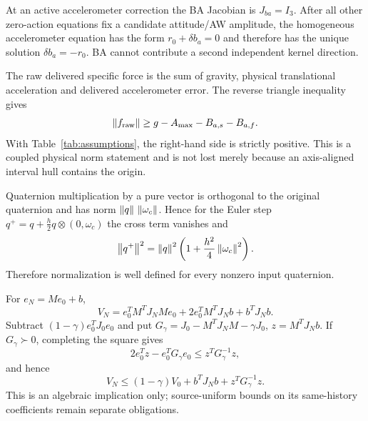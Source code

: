 \documentclass[journal]{IEEEtran}
\begin{document}
\begin{proposition}
At an active accelerometer correction the BA Jacobian is $J_{ba}=I_3$.
After all other zero-action equations fix a candidate attitude/AW amplitude,
the homogeneous accelerometer equation has the form $r_0+\delta b_a=0$ and
therefore has the unique solution $\delta b_a=-r_0$.  BA cannot contribute a
second independent kernel direction.
\end{proposition}

\begin{proposition}
The raw delivered specific force is the sum of gravity, physical translational
acceleration and delivered accelerometer error.  The reverse triangle
inequality gives
\[
 \left\lVert f_{\rm raw}\right\rVert
 \ge g-A_{\max}-B_{a,s}-B_{a,f}.
\]
With Table~\ref{tab:assumptions}, the right-hand side is strictly positive.
This is a coupled physical norm statement and is not lost merely because an
axis-aligned interval hull contains the origin.
\end{proposition}

\begin{proposition}
Quaternion multiplication by a pure vector is orthogonal to the original
quaternion and has norm $\left\lVert q\right\rVert\,\left\lVert\omega_c\right\rVert$.  Hence for the Euler step
$q^+=q+\frac h2q\otimes(0,\omega_c)$ the cross term vanishes and
\[
 \left\lVert q^+\right\rVert^2=\left\lVert q\right\rVert^2\left(1+\frac{h^2}{4}\left\lVert\omega_c\right\rVert^2\right).
\]
Therefore normalization is well defined for every nonzero input quaternion.
\end{proposition}

\begin{proposition}
For $e_N=Me_0+b$,
\[
V_N=e_0^TM^TJ_NMe_0+2e_0^TM^TJ_Nb+b^TJ_Nb .
\]
Subtract $(1-\gamma)e_0^TJ_0e_0$ and put
$G_\gamma=J_0-M^TJ_NM-\gamma J_0$, $z=M^TJ_Nb$.
If $G_\gamma\succ0$, completing the square gives
\[
2e_0^Tz-e_0^TG_\gamma e_0
\le z^TG_\gamma^{-1}z ,
\]
and hence
\[
V_N\le(1-\gamma)V_0+
b^TJ_Nb+z^TG_\gamma^{-1}z .
\]
This is an algebraic implication only; source-uniform bounds on its
same-history coefficients remain separate obligations.
\end{proposition}
\end{document}
